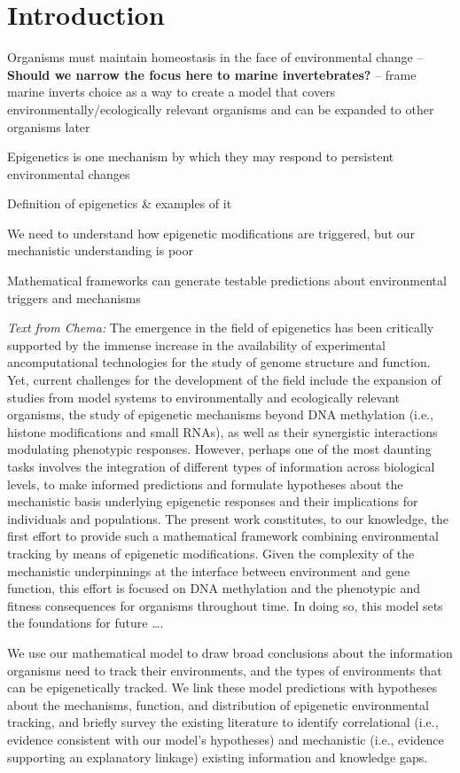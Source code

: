 \documentclass{article}
\begin{document}
\clearpage

\section*{Introduction}

Organisms must maintain homeostasis in the face of environmental change -- \textbf{Should we narrow the focus here to marine invertebrates?}
-- frame marine inverts choice as a way to create a model that covers environmentally/ecologically relevant organisms and can be expanded to other organisms later


Epigenetics is one mechanism by which they may respond to persistent environmental changes

Definition of epigenetics \& examples of it

We need to understand how epigenetic modifications are triggered, but our mechanistic understanding is poor

Mathematical frameworks can generate testable predictions about environmental triggers and mechanisms

\textit{Text from Chema:} The emergence in the field of epigenetics has been critically supported by the immense increase in the availability of experimental ancomputational technologies for the study of genome structure and function. Yet, current challenges for the development of the field include the expansion of studies from model systems to environmentally and ecologically relevant organisms, the study of epigenetic mechanisms beyond DNA methylation (i.e., histone modifications and small RNAs), as well as their synergistic interactions modulating phenotypic responses. However, perhaps one of the most daunting tasks involves the integration of different types of information across biological levels, to make informed predictions and formulate hypotheses about the mechanistic basis underlying epigenetic responses and their implications for individuals and populations. The present work constitutes, to our knowledge, the first effort to provide such a mathematical framework combining environmental tracking by means of epigenetic modifications. Given the complexity of the mechanistic underpinnings at the interface between environment and gene function, this effort is focused on DNA methylation and the phenotypic and fitness consequences for organisms throughout time. In doing so, this model sets the foundations for future ….

We use our mathematical model to draw broad conclusions about the information organisms need to track their environments, and the types of environments that can be epigenetically tracked. We link these model predictions with hypotheses about the mechanisms, function, and distribution of epigenetic environmental tracking, and briefly survey the existing literature to identify correlational (i.e., evidence consistent with our model's hypotheses) and mechanistic (i.e., evidence supporting an explanatory linkage) existing information and knowledge gaps.
\end{document}
